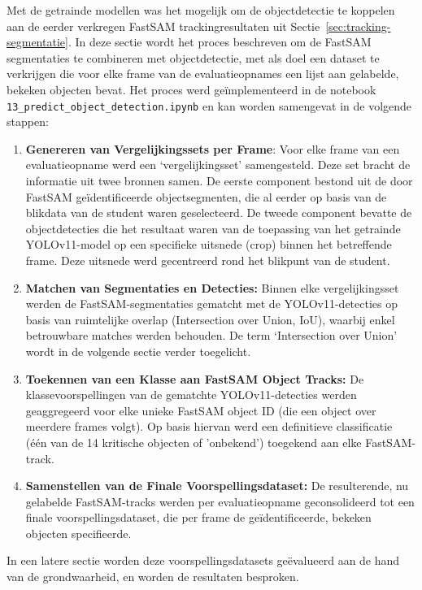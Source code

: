 Met de getrainde modellen was het mogelijk om de objectdetectie te koppelen aan de eerder verkregen FastSAM trackingresultaten uit Sectie~\ref{sec:tracking-segmentatie}.
In deze sectie wordt het proces beschreven om de FastSAM segmentaties te combineren met objectdetectie,
met als doel een dataset te verkrijgen die voor elke frame van de evaluatieopnames een lijst aan gelabelde, bekeken objecten bevat.
Het proces werd geïmplementeerd in de notebook \texttt{13\_predict\_object\_detection.ipynb} en kan worden samengevat in de volgende stappen:
\begin{enumerate}
    \item \textbf{Genereren van Vergelijkingssets per Frame}: Voor elke frame van een evaluatieopname werd een 
    `vergelijkingsset' samengesteld. 
    Deze set bracht de informatie uit twee bronnen samen. 
    De eerste component bestond uit de door FastSAM geïdentificeerde objectsegmenten, 
    die al eerder op basis van de blikdata van de student waren geselecteerd. 
    De tweede component bevatte de objectdetecties die het resultaat waren van de toepassing van het getrainde 
    YOLOv11-model op een specifieke uitsnede (crop) binnen het betreffende frame. 
    Deze uitsnede werd gecentreerd rond het blikpunt van de student.
    \item \textbf{Matchen van Segmentaties en Detecties:} 
    Binnen elke vergelijkingsset werden de FastSAM-segmentaties gematcht met de YOLOv11-detecties op 
    basis van ruimtelijke overlap (Intersection over Union, IoU), waarbij enkel betrouwbare matches werden behouden.
    De term `Intersection over Union' wordt in de volgende sectie verder toegelicht.
    \item \textbf{Toekennen van een Klasse aan FastSAM Object Tracks:} 
    De klassevoorspellingen van de gematchte YOLOv11-detecties werden geaggregeerd voor elke unieke FastSAM object ID 
    (die een object over meerdere frames volgt). 
    Op basis hiervan werd een definitieve classificatie (één van de 14 kritische objecten of 'onbekend') 
    toegekend aan elke FastSAM-track.
    \item \textbf{Samenstellen van de Finale Voorspellingsdataset:} 
    De resulterende, nu gelabelde FastSAM-tracks werden per evaluatieopname geconsolideerd 
    tot een finale voorspellingsdataset, die per frame de geïdentificeerde, bekeken objecten specifieerde.
\end{enumerate}
In een latere sectie worden deze voorspellingsdatasets geëvalueerd aan de hand van de grondwaarheid, en worden de resultaten besproken.

